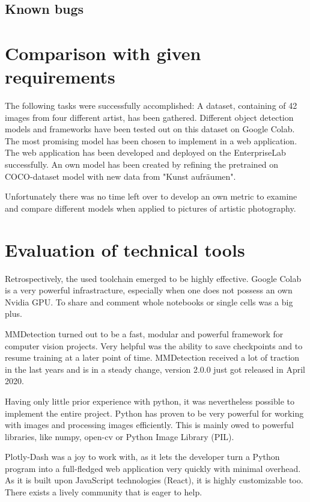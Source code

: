 \subsection{Known bugs}

\section{Comparison with given requirements}

The following tasks were successfully accomplished: A dataset, containing of 42 images from four different artist, has been gathered. Different object detection models and frameworks have been tested out on this dataset on Google Colab. The most promising model has been chosen to implement in a web application. The web application has been developed and deployed on the EnterpriseLab successfully. An own model has been created by refining the pretrained on COCO-dataset model with new data from "Kunst aufräumen".

Unfortunately there was no time left over to develop an own metric to examine and compare different models when applied to pictures of artistic photography.

\section{Evaluation of technical tools}

Retrospectively, the used toolchain emerged to be highly effective. Google Colab is a very powerful infrastracture, especially when one does not possess an own Nvidia GPU. To share and comment whole notebooks or single cells was a big plus.

MMDetection turned out to be a fast, modular and powerful framework for computer vision projects. Very helpful was the ability to save checkpoints and to resume training at a later point of time. MMDetection received a lot of traction in the last years and is in a steady change, version 2.0.0 just got released in April 2020.

Having only little prior experience with python, it was nevertheless possible to implement the entire project. Python has proven to be very powerful for working with images and processing images efficiently. This is mainly owed to powerful libraries, like numpy, open-cv or Python Image Library (PIL).

Plotly-Dash was a joy to work with, as it lets the developer turn a Python program into a full-fledged web application very quickly with minimal overhead. As it is built upon JavaScript technologies (React), it is highly customizable too. There exists a lively community that is eager to help.


